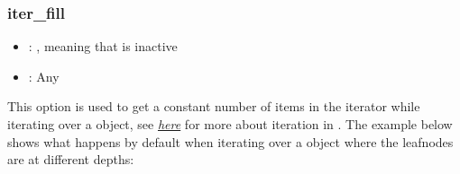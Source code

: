 \documentclass[a4paper,10pt,english]{sphinxmanual}
\begin{document}
\subsubsection{iter\_fill}
\label{\detokenize{README:iter-fill}}\begin{itemize}
\item {}
\sphinxAtStartPar
{}: , meaning that  is inactive

\item {}
\sphinxAtStartPar
{}: Any

\end{itemize}

\sphinxAtStartPar
This option is used to get a constant number of items in the iterator while iterating over a \sphinxhyphen{}object, see {\hyperref[\detokenize{README:iterating-over-nested-objects}]{\emph{here}}} for more about iteration in . The example below shows what happens by default when iterating over a \sphinxhyphen{}object where the leaf\sphinxhyphen{}nodes are at different depths:
\end{document}
